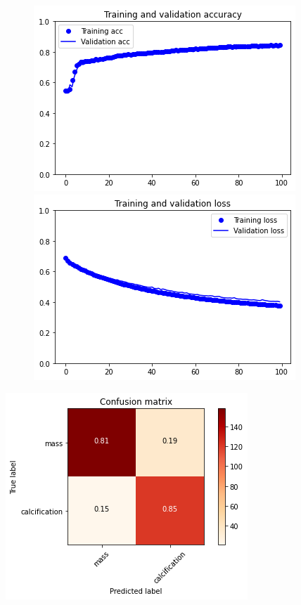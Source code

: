 \documentclass{article}
\begin{document}
\begin{figure}[h]
    \centering
    \begin{minipage}{0.45\textwidth}
        \centering
        \includegraphics[scale=0.46]{./img/preTrainVal3_fe.png}
    \end{minipage}\hfill
    \begin{minipage}{0.45\textwidth}
        \centering
        \includegraphics[scale=0.46]{./img/preTrainLoss3_fe.png}
    \end{minipage}
\end{figure}

\begin{center}
\begin{minipage}{0.45\textwidth}
        \includegraphics[scale=0.6]{./img/cmPreTrain3_fe.png}
    \end{minipage}
\end{center}
\end{document}
